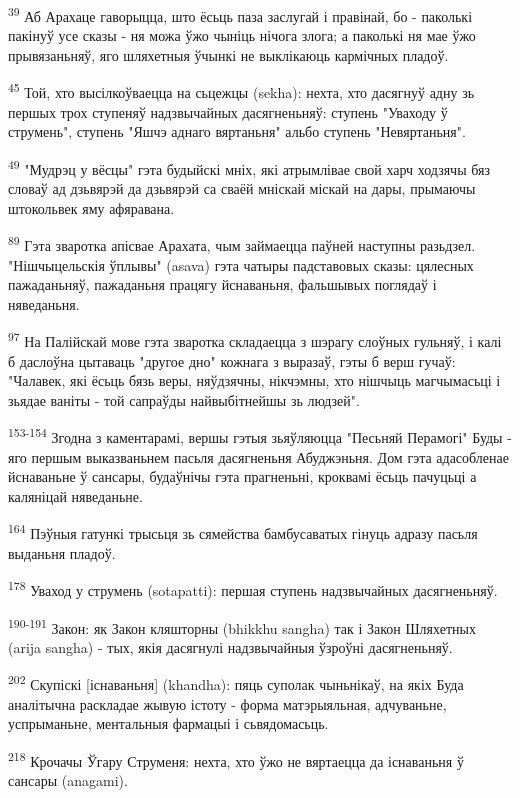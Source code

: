 \documentclass{article}
\begin{document}
\textsuperscript{39} Аб Арахаце гаворыцца, што ёсьць паза заслугай і
правінай, бо - паколькі пакінуў усе сказы - ня можа ўжо чыніць нічога
злога; а паколькі ня мае ўжо прывязаньняў, яго шляхетныя ўчынкі не
выклікаюць кармічных пладоў.

\textsuperscript{45} Той, хто высілкоўваецца на сьцежцы (sekha): нехта,
хто дасягнуў адну зь першых трох ступеняў надзвычайных дасягненьняў:
ступень "Уваходу ў струмень", ступень "Яшчэ аднаго вяртаньня" альбо
ступень "Невяртаньня".

\textsuperscript{49} "Мудрэц у вёсцы" гэта будыйскі мніх, які атрымлівае
свой харч ходзячы бяз словаў ад дзьвярэй да дзьвярэй са сваёй мніскай
міскай на дары, прымаючы штокольвек яму афяравана.

\textsuperscript{89} Гэта зваротка апісвае Арахата, чым займаецца паўней
наступны разьдзел. "Нішчыцельскія ўплывы" (asava) гэта чатыры
падставовых сказы: цялесных пажаданьняў, пажаданьня працягу йснаваньня,
фальшывых поглядаў і няведаньня.

\textsuperscript{97} На Палійскай мове гэта зваротка складаецца з шэрагу
слоўных гульняў, і калі б даслоўна цытаваць "другое дно" кожнага з
выразаў, гэты б верш гучаў: "Чалавек, які ёсьць бязь веры, няўдзячны,
нікчэмны, хто нішчыць магчымасьці і зьядае ваніты - той сапраўды
найвыбітнейшы зь людзей".

\textsuperscript{153-154} Згодна з каментарамі, вершы гэтыя зьяўляюцца
"Песьняй Перамогі" Буды - яго першым выказваньнем пасьля дасягненьня
Абуджэньня. Дом гэта адасобленае йснаваньне ў сансары, будаўнічы гэта
прагненьні, кроквамі ёсьць пачуцьці а каляніцай няведаньне.

\textsuperscript{164} Пэўныя гатункі трысьця зь сямейства бамбусаватых
гінуць адразу пасьля выданьня пладоў.

\textsuperscript{178} Уваход у струмень (sotapatti): першая ступень
надзвычайных дасягненьняў.

\textsuperscript{190-191} Закон: як Закон кляшторны (bhikkhu sangha) так
і Закон Шляхетных (arija sangha) - тых, якія дасягнулі надзвычайныя
ўзроўні дасягненьняў.

\textsuperscript{202} Скупіскі {[}існаваньня{]} (khandha): пяць суполак
чыньнікаў, на якіх Буда аналітычна раскладае жывую істоту - форма
матэрыяльная, адчуваньне, успрыманьне, ментальныя фармацыі і
сьвядомасьць.

\textsuperscript{218} Крочачы Ўгару Струменя: нехта, хто ўжо не
вяртаецца да існаваньня ў сансары (anagami).
\end{document}
